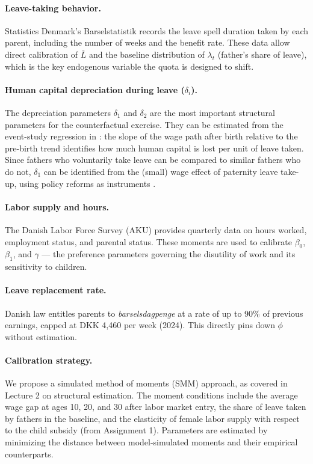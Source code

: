 \paragraph{Leave-taking behavior.}
Statistics Denmark's Barselstatistik records the leave spell duration taken by each parent, including the number of weeks and the benefit rate. These data allow direct calibration of $\bar{L}$ and the baseline distribution of $\lambda_t$ (father's share of leave), which is the key endogenous variable the quota is designed to shift.

\paragraph{Human capital depreciation during leave ($\delta_i$).}
The depreciation parameters $\delta_1$ and $\delta_2$ are the most important structural parameters for the counterfactual exercise. They can be estimated from the event-study regression in \citet{kleven2019children}: the slope of the wage path after birth relative to the pre-birth trend identifies how much human capital is lost per unit of leave taken. Since fathers who voluntarily take leave can be compared to similar fathers who do not, $\delta_1$ can be identified from the (small) wage effect of paternity leave take-up, using policy reforms as instruments \citep{patnaik2019reserving}.

\paragraph{Labor supply and hours.}
The Danish Labor Force Survey (AKU) provides quarterly data on hours worked, employment status, and parental status. These moments are used to calibrate $\beta_0$, $\beta_1$, and $\gamma$ --- the preference parameters governing the disutility of work and its sensitivity to children.

\paragraph{Leave replacement rate.}
Danish law entitles parents to \textit{barselsdagpenge} at a rate of up to 90\% of previous earnings, capped at DKK 4,460 per week (2024). This directly pins down $\phi$ without estimation.

\paragraph{Calibration strategy.}
We propose a simulated method of moments (SMM) approach, as covered in Lecture 2 on structural estimation. The moment conditions include the average wage gap at ages 10, 20, and 30 after labor market entry, the share of leave taken by fathers in the baseline, and the elasticity of female labor supply with respect to the child subsidy (from Assignment 1). Parameters are estimated by minimizing the distance between model-simulated moments and their empirical counterparts.

